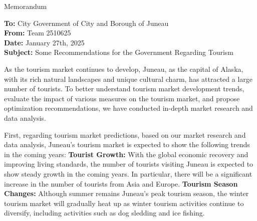 \documentclass[12pt]{article}  %
\begin{document}
\begin{letter}{Memorandum}
\begin{flushleft}  %
\textbf{To:} City Government of City and Borough of Juneau\\
\textbf{From:} Team 2510625\\
\textbf{Date:} January 27th, 2025\\
\textbf{Subject:} Some Recommendations for the Government Regarding Tourism
\end{flushleft}

As the tourism market continues to develop, Juneau, as the capital of Alaska, with its rich natural landscapes and unique cultural charm, has attracted a large number of tourists. To better understand tourism market development trends, evaluate the impact of various measures on the tourism market, and propose optimization recommendations, we have conducted in-depth market research and data analysis.

First, regarding tourism market predictions, based on our market research and data analysis, Juneau's tourism market is expected to show the following trends in the coming years:
\textbf{Tourist Growth:} With the global economic recovery and improving living standards, the number of tourists visiting Juneau is expected to show steady growth in the coming years. In particular, there will be a significant increase in the number of tourists from Asia and Europe.
\textbf{Tourism Season Changes:} Although summer remains Juneau's peak tourism season, the winter tourism market will gradually heat up as winter tourism activities continue to diversify, including activities such as dog sledding and ice fishing.


\end{letter}
\end{document}
